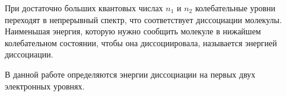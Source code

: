 При достаточно больших квантовых числах $n_1$ и $n_2$ колебательные уровни
переходят в непрерывный спектр, что соответствует диссоциации молекулы.
Наименьшая энергия, которую нужно сообщить молекуле в нижайшем колебательном
состоянии, чтобы она диссоциировала, называется энергией диссоциации.

В данной работе определяются энергии диссоциации на первых двух электронных
уровнях.